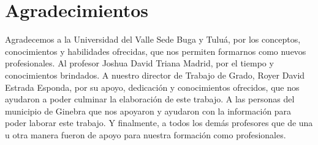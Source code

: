 \documentclass[12pt,letterpaper,openany]{book}
\begin{document}
\chapter*{Agradecimientos} %
Agradecemos a la Universidad del Valle Sede Buga y Tuluá, por los conceptos, conocimientos y habilidades ofrecidas, que nos permiten formarnos como nuevos profesionales.
\vspace{5mm}\newline
Al profesor Joshua David Triana Madrid, por el tiempo y conocimientos brindados.
\vspace{5mm}\newline
A nuestro director de Trabajo de Grado, Royer David Estrada Esponda, por su apoyo, dedicación y conocimientos ofrecidos, que nos ayudaron a poder culminar la elaboración de este trabajo.
\vspace{5mm}\newline
A las personas del municipio de Ginebra que nos apoyaron y ayudaron con la información para poder laborar este trabajo.
\vspace{5mm}\newline
Y finalmente, a todos los demás profesores que de una u otra manera fueron de apoyo para nuestra formación como profesionales.

\newpage
{}
\tableofcontents %

\newpage
\listoffigures %

\newpage
\listoftables %

\end{document}
